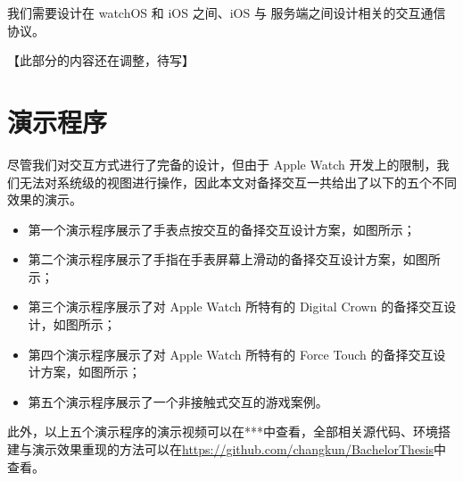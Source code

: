 我们需要设计在 watchOS 和 iOS 之间、iOS 与 服务端之间设计相关的交互通信协议。

【此部分的内容还在调整，待写】

\section{演示程序}

尽管我们对交互方式进行了完备的设计，但由于 Apple Watch 开发上的限制，我们无法对系统级的视图进行操作，因此本文对备择交互一共给出了以下的五个不同效果的演示。

\begin{itemize}
    \item 第一个演示程序展示了手表点按交互的备择交互设计方案，如图所示；
    \item 第二个演示程序展示了手指在手表屏幕上滑动的备择交互设计方案，如图所示；
    \item 第三个演示程序展示了对 Apple Watch 所特有的 Digital Crown 的备择交互设计，如图所示；
    \item 第四个演示程序展示了对 Apple Watch 所特有的 Force Touch 的备择交互设计方案，如图所示；
    \item 第五个演示程序展示了一个非接触式交互的游戏案例。
\end{itemize}

此外，以上五个演示程序的演示视频可以在***中查看，全部相关源代码、环境搭建与演示效果重现的方法可以在\url{https://github.com/changkun/BachelorThesis}中查看。
